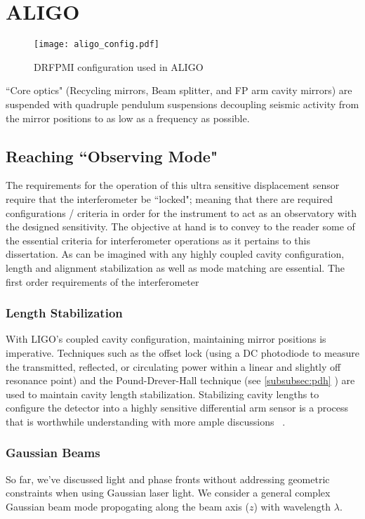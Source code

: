 \section{ALIGO}

\begin{figure}[H]
  \begin{center}
	  \texttt{[image: aligo\_config.pdf]}
  \end{center}
  \caption{DRFPMI configuration used in ALIGO}
  \label{fig:simple_michelson}
\end{figure}

``Core optics" (Recycling mirrors, Beam splitter, and FP arm cavity mirrors) are suspended with quadruple pendulum suspensions decoupling seismic activity from the mirror positions to as low as a frequency as possible. 

\subsection{Reaching ``Observing Mode"}
The requirements for the operation of this ultra sensitive displacement sensor require that the interferometer be  ``locked"; meaning that there are required configurations / criteria in order for the instrument to act as an observatory with the designed sensitivity. The objective at hand is to convey to the reader some of the essential criteria for interferometer operations as it pertains to this dissertation. As can be imagined with any highly coupled cavity configuration, length and alignment stabilization as well as mode matching are essential. The first order requirements of the interferometer

\subsubsection{Length Stabilization}
With LIGO's coupled cavity configuration, maintaining mirror positions is imperative. Techniques such as the offset lock (using a DC photodiode to measure the transmitted, reflected, or circulating power within a linear and slightly off resonance point) \cite{} and the Pound-Drever-Hall technique (see \ref{subsubsec:pdh} ) are used to maintain cavity length stabilization. Stabilizing cavity lengths to configure the detector into a highly sensitive differential arm sensor is a process that is worthwhile understanding with more ample discussions ~\cite{Mullavey:12}.

\subsubsection{Gaussian Beams}
So far, we've discussed light and phase fronts without addressing geometric constraints when using Gaussian laser light. We consider a general complex Gaussian beam mode propogating along the beam axis ($z$) with wavelength $\lambda$.

